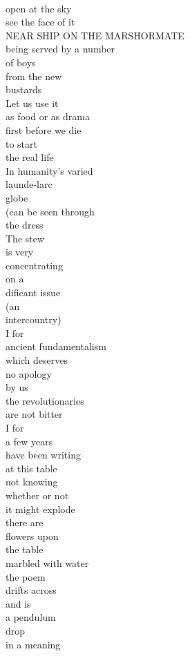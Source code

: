 \documentclass[smalldemyvopaper,11pt,twoside,onecolumn,openright,extrafontsizes]{memoir}
\newlength\drop
\begin{document}
\\open at the sky
\\see the face of it
\\NEAR SHIP ON THE MARSHORMATE
\\being served by a number
\\of boys
\\from the new
\\bustards
\\Let us use it
\\as food or as drama
\\first before we die
\\to start
\\the real life
\\In humanity's varied
\\launde-larc
\\globe
\\(can be seen through
\\the dress
\\The stew
\\is very
\\concentrating
\\on a
\\dificant issue
\\(an
\\intercountry)
\\I for
\\ancient fundamentalism
\\which deserves
\\no apology
\\by us
\\the revolutionaries
\\are not bitter
\\I for
\\a few years
\\have been writing
\\at this table
\\not knowing
\\whether or not
\\it might explode
\\there are
\\flowers upon
\\the table
\\marbled with water
\\the poem
\\drifts across
\\and is
\\a pendulum
\\drop
\\in a meaning
\end{document}
